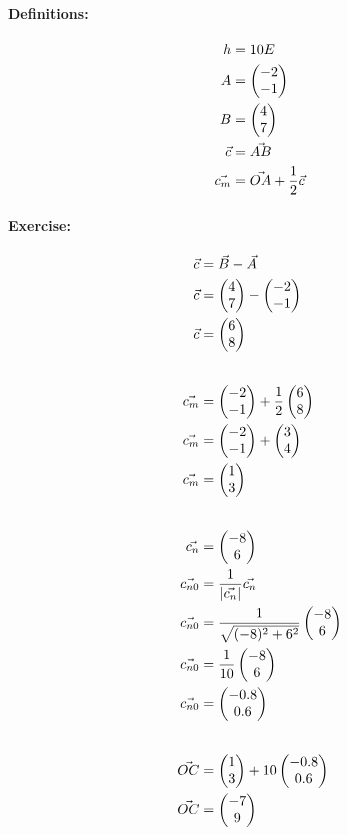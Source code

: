 \documentclass{article}
\begin{document}
\def\ABnorm{\begin{pmatrix}
    -8 \\ 
    6
\end{pmatrix}}

\def\ABnrommag{\sqrt{(-8)^2 + 6^2}}

\def\ABmidzero{\begin{pmatrix}
    -0.8 \\ 
    0.6
\end{pmatrix}}

\paragraph{Definitions:}
\begin{align*}
    h &= 10 E \\
    A &= \begin{pmatrix} -2 \\ -1 \end{pmatrix} \\
    B &= \begin{pmatrix} 4 \\ 7 \end{pmatrix} \\
    \vec{c} &= \vec{AB} \\
    \vec{c_m} &= \vec{OA} + \frac{1}{2} \vec{c}
\end{align*}

\paragraph{Exercise:}
\begin{align*}
    \vec{c} &= \vec{B} - \vec{A} \\
    \vec{c} &= \B - \A \\
    \vec{c} &= \AB \\[20pt]
    \vec{c_m} &= \A + \frac{1}{2}\AB \\
    \vec{c_m} &= \A  + \ABhalf \\
    \vec{c_m} &= \ABmid \\[20pt]
    \vec{c_n} &= \ABnorm \\
    \vec{c_{n0}} &= \frac{1}{|\vec{c_n}|}\vec{c_n} \\
    \vec{c_{n0}} &= \frac{1}{\ABnrommag}\ABnorm \\
    \vec{c_{n0}} &= \frac{1}{10}\ABnorm \\
    \vec{c_{n0}} &= \ABmidzero \\[20pt]
    \vec{OC} &= \ABmid + \height\ABmidzero \\
    \vec{OC} &= \begin{pmatrix}
        -7 \\ 
        9
    \end{pmatrix}
\end{align*}
\end{document}
